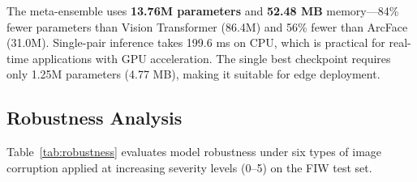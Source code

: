\documentclass[journal,12pt]{IEEEtran}
\begin{document}
\begin{table}[t]
    \centering
    \caption{Computational efficiency comparison. Memory and latency
    measured on CPU.}
    \label{tab:efficiency}
\end{table}

The meta-ensemble uses \textbf{13.76M parameters} and \textbf{52.48 MB}
memory—84\% fewer parameters than Vision Transformer (86.4M) and 56\%
fewer than ArcFace (31.0M). Single-pair inference takes 199.6 ms on CPU,
which is practical for real-time applications with GPU acceleration. The
single best checkpoint requires only 1.25M parameters (4.77 MB), making
it suitable for edge deployment.

\subsection{Robustness Analysis}
\label{sec:robustness}

Table~\ref{tab:robustness} evaluates model robustness under six types of
image corruption applied at increasing severity levels (0--5) on the
FIW test set.
\end{document}
